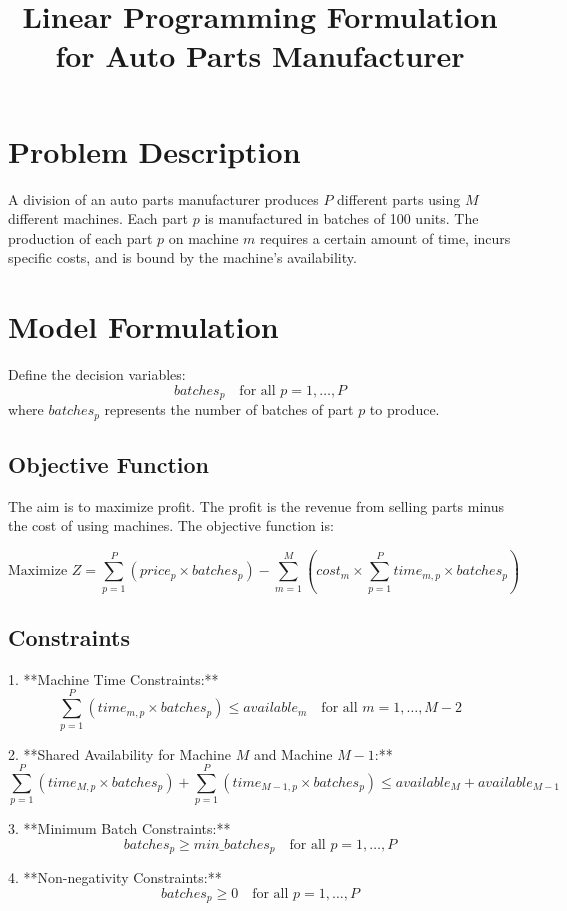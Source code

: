 \documentclass{article}
\begin{document}
\title{Linear Programming Formulation for Auto Parts Manufacturer}
\author{}
\date{}
\maketitle

\section*{Problem Description}

A division of an auto parts manufacturer produces $P$ different parts using $M$ different machines. Each part $p$ is manufactured in batches of 100 units. The production of each part $p$ on machine $m$ requires a certain amount of time, incurs specific costs, and is bound by the machine's availability.

\section*{Model Formulation}

Define the decision variables:
\[
batches_p \quad \text{for all } p = 1, \ldots, P
\]
where $batches_p$ represents the number of batches of part $p$ to produce.

\subsection*{Objective Function}

The aim is to maximize profit. The profit is the revenue from selling parts minus the cost of using machines. The objective function is:

\[
\text{Maximize } Z = \sum_{p=1}^{P} \left( price_{p} \times batches_p \right) - \sum_{m=1}^{M} \left( cost_{m} \times \sum_{p=1}^{P} time_{m,p} \times batches_p \right)
\]

\subsection*{Constraints}

1. **Machine Time Constraints:**
   \[
   \sum_{p=1}^{P} \left( time_{m,p} \times batches_p \right) \leq available_{m} \quad \text{for all } m = 1, \ldots, M-2
   \]

2. **Shared Availability for Machine $M$ and Machine $M-1$:**
   \[
   \sum_{p=1}^{P} \left( time_{M,p} \times batches_p \right) + \sum_{p=1}^{P} \left( time_{M-1,p} \times batches_p \right) \leq available_{M} + available_{M-1}
   \]

3. **Minimum Batch Constraints:**
   \[
   batches_p \geq min\_batches_{p} \quad \text{for all } p = 1, \ldots, P
   \]

4. **Non-negativity Constraints:**
   \[
   batches_p \geq 0 \quad \text{for all } p = 1, \ldots, P
   \]
\end{document}
